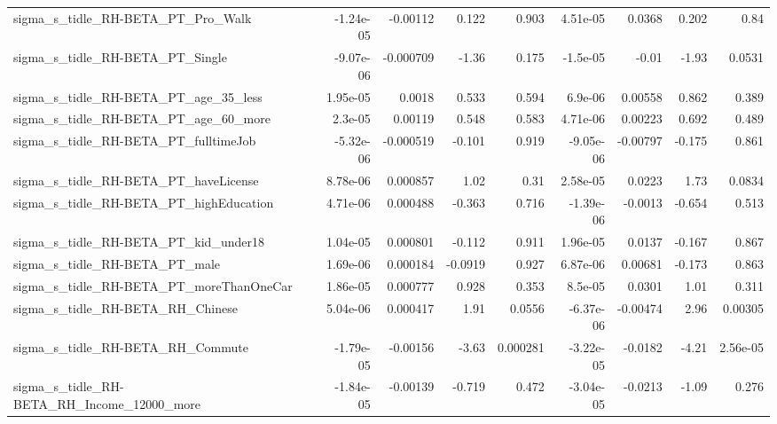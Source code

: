 \begin{tabular}{lrrrrrrrr}
sigma\_s\_tidle\_RH-BETA\_PT\_Pro\_Walk                  &   -1.24e-05 &     -0.00112 &    0.122 &    0.903 &   4.51e-05 &      0.0368 &        0.202 &          0.84 \\
sigma\_s\_tidle\_RH-BETA\_PT\_Single                    &   -9.07e-06 &    -0.000709 &    -1.36 &    0.175 &   -1.5e-05 &       -0.01 &        -1.93 &        0.0531 \\
sigma\_s\_tidle\_RH-BETA\_PT\_age\_35\_less               &    1.95e-05 &       0.0018 &    0.533 &    0.594 &    6.9e-06 &     0.00558 &        0.862 &         0.389 \\
sigma\_s\_tidle\_RH-BETA\_PT\_age\_60\_more               &     2.3e-05 &      0.00119 &    0.548 &    0.583 &   4.71e-06 &     0.00223 &        0.692 &         0.489 \\
sigma\_s\_tidle\_RH-BETA\_PT\_fulltimeJob               &   -5.32e-06 &    -0.000519 &   -0.101 &    0.919 &  -9.05e-06 &    -0.00797 &       -0.175 &         0.861 \\
sigma\_s\_tidle\_RH-BETA\_PT\_haveLicense               &    8.78e-06 &     0.000857 &     1.02 &     0.31 &   2.58e-05 &      0.0223 &         1.73 &        0.0834 \\
sigma\_s\_tidle\_RH-BETA\_PT\_highEducation             &    4.71e-06 &     0.000488 &   -0.363 &    0.716 &  -1.39e-06 &     -0.0013 &       -0.654 &         0.513 \\
sigma\_s\_tidle\_RH-BETA\_PT\_kid\_under18               &    1.04e-05 &     0.000801 &   -0.112 &    0.911 &   1.96e-05 &      0.0137 &       -0.167 &         0.867 \\
sigma\_s\_tidle\_RH-BETA\_PT\_male                      &    1.69e-06 &     0.000184 &  -0.0919 &    0.927 &   6.87e-06 &     0.00681 &       -0.173 &         0.863 \\
sigma\_s\_tidle\_RH-BETA\_PT\_moreThanOneCar            &    1.86e-05 &     0.000777 &    0.928 &    0.353 &    8.5e-05 &      0.0301 &         1.01 &         0.311 \\
sigma\_s\_tidle\_RH-BETA\_RH\_Chinese                   &    5.04e-06 &     0.000417 &     1.91 &   0.0556 &  -6.37e-06 &    -0.00474 &         2.96 &       0.00305 \\
sigma\_s\_tidle\_RH-BETA\_RH\_Commute                   &   -1.79e-05 &     -0.00156 &    -3.63 & 0.000281 &  -3.22e-05 &     -0.0182 &        -4.21 &      2.56e-05 \\
sigma\_s\_tidle\_RH-BETA\_RH\_Income\_12000\_more         &   -1.84e-05 &     -0.00139 &   -0.719 &    0.472 &  -3.04e-05 &     -0.0213 &        -1.09 &         0.276 \\

\end{tabular}
